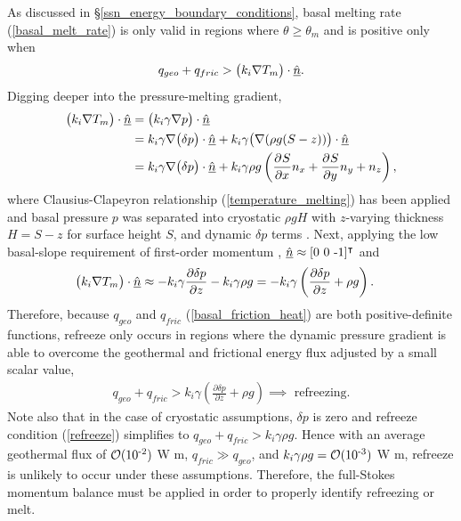 As discussed in \S \ref{ssn_energy_boundary_conditions}, basal melting rate (\ref{basal_melt_rate}) is only valid in regions where $\theta \ge \theta_m$ and is positive only when
\begin{align}
  q_{geo} + q_{fric} > \big( k_i \nabla T_m \big) \cdot \underline{\hat{n}}.
\end{align}
Digging deeper into the pressure-melting gradient,
\begin{align}
  \big( k_i \nabla T_m \big) \cdot \underline{\hat{n}} &= \big( k_i \gamma \nabla p \big) \cdot \underline{\hat{n}} \notag \\
  &= k_i \gamma \nabla \big( \delta p \big) \cdot \underline{\hat{n}} + k_i \gamma \big( \nabla (\rho g (S - z)) \big) \cdot \underline{\hat{n}} \notag \\
  &= k_i \gamma \nabla \big( \delta p \big) \cdot \underline{\hat{n}} + k_i \gamma \rho g \left( \frac{\partial^{} S}{\partial x^{} } n_x + \frac{\partial^{} S}{\partial y^{} } n_y  + n_z \right) \notag,
\end{align}
where Clausius-Clapeyron relationship (\ref{temperature_melting}) has been applied and basal pressure $p$ was separated into cryostatic $\rho g H$ with $z$-varying thickness $H = S - z$ for surface height $S$, and dynamic $\delta p$ terms   .  Next, applying the low basal-slope requirement of first-order momentum \citet{blatter_1995, pattyn_2003}, $\underline{\hat{n}} \approx [0\ 0\ \text{-}1]^\intercal$ and
\begin{align}
  \big( k_i \nabla T_m \big) \cdot \underline{\hat{n}}
  &\approx - k_i \gamma \frac{\partial \delta p}{\partial z} - k_i \gamma \rho g = - k_i \gamma \left( \frac{\partial \delta p}{\partial z} + \rho g \right).
\end{align}
Therefore, because $q_{geo}$ and $q_{fric}$ (\ref{basal_friction_heat}) are both positive-definite functions, refreeze only occurs in regions where the dynamic pressure gradient is able to overcome the geothermal and frictional energy flux adjusted by a small scalar value,
\begin{align}
  \label{refreeze}
  q_{geo} + q_{fric} > k_i \gamma \left( \frac{\partial \delta p}{\partial z} + \rho g \right) \implies \text{ refreezing.}
\end{align}
Note also that in the case of cryostatic assumptions, $\delta p$ is zero and refreeze condition (\ref{refreeze}) simplifies to $q_{geo} + q_{fric} > k_i \gamma \rho g$.  Hence with an average geothermal flux of $\mathcal{O}(10^{\textrm{-2}})$ W m, $q_{fric} \gg q_{geo}$, and $k_i \gamma \rho g = \mathcal{O}(10^{\textrm{-3}})$ W m, refreeze is unlikely to occur under these assumptions.  Therefore, the full-Stokes momentum balance must be applied in order to properly identify refreezing or melt.


